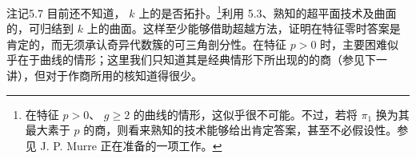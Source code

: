 \begin{SGAresult}{注记}{5.7}
目前还不知道， $k$ 上的是否拓扑。\footnote{在特征 $p>0$、 $g\geq2$ 的曲线的情形，这似乎很不可能。不过，若将 $\pi_1$ 换为其最大素于 $p$ 的商，则看来熟知的技术能够给出肯定答案，甚至不必假设性。参见 J. P. Murre 正在准备的一项工作。}利用 5.3、熟知的超平面技术及曲面的，可归结到 $k$ 上的曲面。这样至少能够借助超越方法，证明在特征零时答案是肯定的，而无须承认奇异代数簇的可三角剖分性。在特征 $p>0$ 时，主要困难似乎在于曲线的情形；这里我们只知道其是经典情形下所出现的的商（参见下一讲），但对于作商所用的核知道得很少。
\end{SGAresult}

